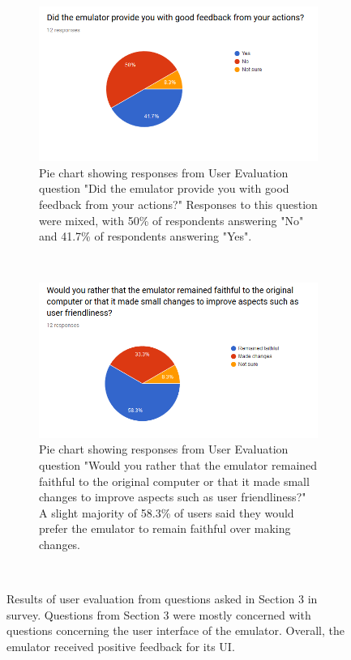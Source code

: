 \documentclass{l4proj}
\begin{document}
\begin{figure}[!h]
\begin{subfigure}[t]{0.45\textwidth}
		\label{fig:chart-2}
	\end{subfigure}
	~
	\begin{subfigure}[t]{0.45\textwidth}
		\includegraphics[width=\textwidth]{images/chart-3}
		\caption{Pie chart showing responses from User Evaluation question "Did the emulator provide you with good feedback from your actions?" Responses to this question were mixed, with 50\% of respondents answering "No" and 41.7\% of respondents answering "Yes".}
		\label{fig:chart-3}
	\end{subfigure}
	~ %
	\begin{subfigure}[t]{0.45\textwidth}
		\includegraphics[width=\textwidth]{images/chart-4}
		\caption{Pie chart showing responses from User Evaluation question "Would you rather that the emulator remained faithful to the original computer or that it made small changes to improve aspects such as user friendliness?" A slight majority of 58.3\% of users said they would prefer the emulator to remain faithful over making changes.}
		\label{fig:chart-4}
	\end{subfigure}
	~ %
	\caption{Results of user evaluation from questions asked in Section 3 in survey. Questions from Section 3 were mostly concerned with questions concerning the user interface of the emulator. Overall, the emulator received positive feedback for its UI.}
	\label{fig:eval-ui}
\end{figure}
\end{document}
